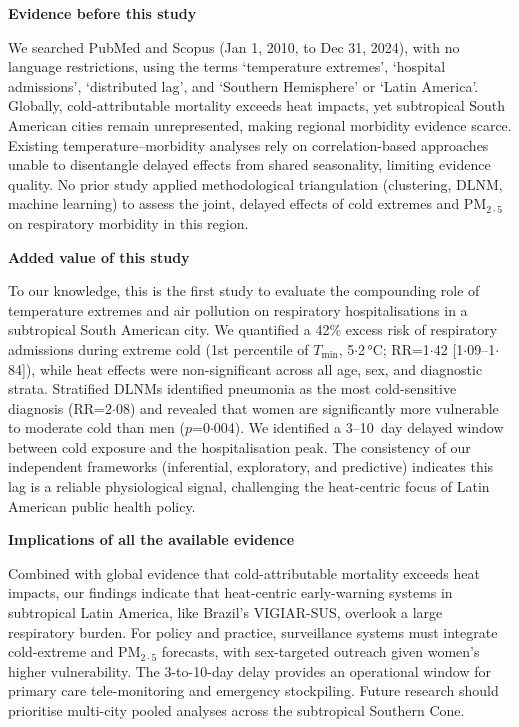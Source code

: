 \documentclass[review,number]{elsarticle}
\begin{document}
\textbf{Evidence before this study}

We searched PubMed and Scopus (Jan 1, 2010, to Dec 31, 2024), with
no language restrictions, using the terms `temperature extremes',
`hospital admissions', `distributed lag', and `Southern
Hemisphere' or `Latin America'. Globally, cold-attributable
mortality exceeds heat impacts, yet subtropical South American cities
remain unrepresented, making regional morbidity evidence scarce.
Existing temperature--morbidity analyses rely on correlation-based
approaches unable to disentangle delayed effects from shared
seasonality, limiting evidence quality. No prior study applied
methodological triangulation (clustering, DLNM, machine learning) to
assess the joint, delayed effects of cold extremes and
$\text{PM}_{2{\cdot}5}$ on respiratory morbidity in this region.

\textbf{Added value of this study}

To our knowledge, this is the first study to evaluate the compounding
role of temperature extremes and air pollution on respiratory
hospitalisations in a subtropical South American city. We quantified a
42\% excess risk of respiratory admissions during extreme cold (1st
percentile of $T_\mathrm{min}$, 5${\cdot}$2\,°C;
RR=1${\cdot}$42 [1${\cdot}$09--1${\cdot}$84]), while heat effects
were non-significant across all age, sex, and diagnostic strata.
Stratified DLNMs identified pneumonia as the most cold-sensitive
diagnosis (RR=2${\cdot}$08) and revealed that women are significantly
more vulnerable to moderate cold than men ($p$=0${\cdot}$004). We
identified a 3--10~day delayed window between cold exposure and
the hospitalisation peak. The consistency of our independent
frameworks (inferential, exploratory, and predictive) indicates this
lag is a reliable physiological signal, challenging the heat-centric
focus of Latin American public health policy.

\textbf{Implications of all the available evidence}

Combined with global evidence that cold-attributable mortality exceeds
heat impacts, our findings indicate that heat-centric early-warning
systems in subtropical Latin America, like Brazil's VIGIAR-SUS,
overlook a large respiratory burden. For policy and practice,
surveillance systems must integrate cold-extreme and
$\text{PM}_{2{\cdot}5}$ forecasts, with sex-targeted outreach given
women's higher vulnerability. The 3-to-10-day delay provides an
operational window for primary care tele-monitoring and emergency
stockpiling. Future research should prioritise multi-city pooled
analyses across the subtropical Southern Cone.
\end{document}

